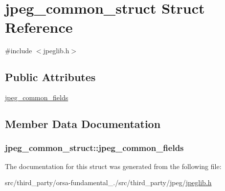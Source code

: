 \hypertarget{structjpeg__common__struct}{}\section{jpeg\+\_\+common\+\_\+struct Struct Reference}
\label{structjpeg__common__struct}


{\ttfamily \#include $<$jpeglib.\+h$>$}

\subsection*{Public Attributes}
\begin{DoxyCompactItemize}
\item 
\hyperlink{structjpeg__common__struct_af0328603f836658f65d39679f6bbfa7a}{jpeg\+\_\+common\+\_\+fields}
\end{DoxyCompactItemize}


\subsection{Member Data Documentation}
\hypertarget{structjpeg__common__struct_af0328603f836658f65d39679f6bbfa7a}{}
\subsubsection[{jpeg\+\_\+common\+\_\+fields}]{\setlength{\rightskip}{0pt plus 5cm}jpeg\+\_\+common\+\_\+struct\+::jpeg\+\_\+common\+\_\+fields}\label{structjpeg__common__struct_af0328603f836658f65d39679f6bbfa7a}


The documentation for this struct was generated from the following file\+:\begin{DoxyCompactItemize}
\item 
src/third\+\_\+party/orsa-\/fundamental\+\_./src/third\+\_\+party/jpeg/\hyperlink{jpeglib_8h}{jpeglib.\+h}\end{DoxyCompactItemize}

